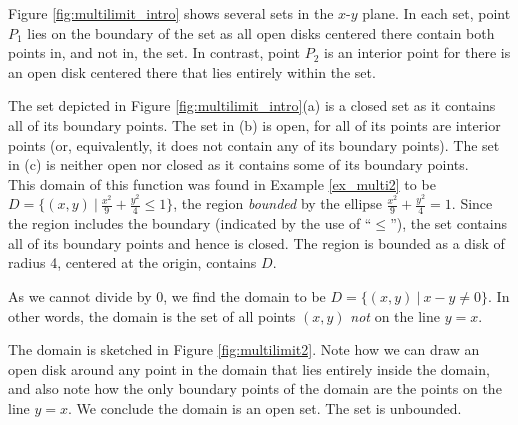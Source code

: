 Figure \ref{fig:multilimit_intro} shows several sets in the $x$-$y$ plane. In each set, point $P_1$ lies on the boundary of the set as all open disks centered there contain both points in, and not in, the set. In contrast, point $P_2$ is an interior point for there is an open disk centered there that lies entirely within the set.

The set depicted in Figure \ref{fig:multilimit_intro}(a) is a closed set as it contains all of its boundary points. The set in (b) is open, for all of its points are interior points (or, equivalently, it does not contain any of its boundary points). The set in (c) is neither open nor closed as it contains  some of its boundary points.\\


{This domain of this function was found in Example \ref{ex_multi2} to be $D = \{(x,y)\ |\ \frac{x^2}9+\frac{y^2}4\leq 1\}$, the region \textit{bounded} by the ellipse $\frac{x^2}9+\frac{y^2}4=1$. Since the region includes the boundary (indicated by the use of ``$\leq$''), the set contains all of its boundary points and hence is closed. The region is bounded as a disk of radius 4, centered at the origin, contains $D$.
}\\
\pagebreak

{As we cannot divide by 0, we find the domain to be $D = \{(x,y)\ |\ x-y\neq 0\}$. In other words, the domain is the set of all points $(x,y)$ \emph{not} on the line $y=x$. 

The domain is sketched in Figure \ref{fig:multilimit2}. Note how we can draw an open disk around any point in the domain that lies entirely inside the domain, and also note how the only boundary points of the domain are the points on the line $y=x$. We conclude the domain is an open set. The set is unbounded.
}\\

